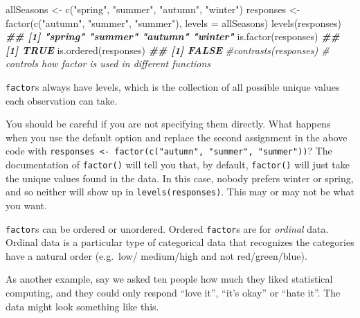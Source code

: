 \documentclass[
  12pt,
]{krantz}
\makeatletter
\newenvironment{Shaded}{\begin{snugshade}}{\end{snugshade}}
\newcommand{\AttributeTok}[1]{\textcolor[rgb]{0.61,0.61,0.61}{#1}}
\newcommand{\CommentTok}[1]{\textcolor[rgb]{0.37,0.37,0.37}{\textit{#1}}}
\newcommand{\DocumentationTok}[1]{\textcolor[rgb]{0.37,0.37,0.37}{\textbf{\textit{#1}}}}
\newcommand{\FunctionTok}[1]{\textcolor[rgb]{0,0,0}{#1}}
\newcommand{\NormalTok}[1]{#1}
\newcommand{\OtherTok}[1]{\textcolor[rgb]{0.37,0.37,0.37}{#1}}
\newcommand{\StringTok}[1]{\textcolor[rgb]{0.5,0.5,0.5}{#1}}
\newenvironment{kframe}{%
\medskip{}
\setlength{\fboxsep}{.8em}
 \def\at@end@of@kframe{}%
 \ifinner\ifhmode%
  \def\at@end@of@kframe{\end{minipage}}%
  \begin{minipage}{\columnwidth}%
 \fi\fi%
 \def\FrameCommand##1{\hskip\@totalleftmargin \hskip-\fboxsep
 \colorbox{shadecolor}{##1}\hskip-\fboxsep
     \hskip-\linewidth \hskip-\@totalleftmargin \hskip\columnwidth}%
 \MakeFramed {\advance\hsize-\width
   \@totalleftmargin\z@ \linewidth\hsize
   \@setminipage}}%
 {\par\unskip\endMakeFramed%
 \at@end@of@kframe}
\renewenvironment{Shaded}{\begin{kframe}}{\end{kframe}}
\makeatother
\begin{document}
\begin{Shaded}
\begin{Highlighting}[]
\NormalTok{allSeasons }\OtherTok{\textless{}{-}} \FunctionTok{c}\NormalTok{(}\StringTok{"spring"}\NormalTok{, }\StringTok{"summer"}\NormalTok{, }\StringTok{"autumn"}\NormalTok{, }\StringTok{"winter"}\NormalTok{)}
\NormalTok{responses }\OtherTok{\textless{}{-}} \FunctionTok{factor}\NormalTok{(}\FunctionTok{c}\NormalTok{(}\StringTok{"autumn"}\NormalTok{, }\StringTok{"summer"}\NormalTok{, }\StringTok{"summer"}\NormalTok{), }
                    \AttributeTok{levels =}\NormalTok{ allSeasons)}
\FunctionTok{levels}\NormalTok{(responses)}
\DocumentationTok{\#\# [1] "spring" "summer" "autumn" "winter"}
\FunctionTok{is.factor}\NormalTok{(responses)}
\DocumentationTok{\#\# [1] TRUE}
\FunctionTok{is.ordered}\NormalTok{(responses)}
\DocumentationTok{\#\# [1] FALSE}
\CommentTok{\#contrasts(responses) \# controls how factor is used in different  functions}
\end{Highlighting}
\end{Shaded}

\texttt{factor}s always have levels, which is the collection of all possible unique values each observation can take.

You should be careful if you are not specifying them directly. What happens when you use the default option and replace the second assignment in the above code with \texttt{responses\ \textless{}-\ factor(c("autumn",\ "summer",\ "summer"))}? The documentation of \texttt{factor()} will tell you that, by default, \texttt{factor()} will just take the unique values found in the data. In this case, nobody prefers winter or spring, and so neither will show up in \texttt{levels(responses)}. This may or may not be what you want.

\texttt{factor}s can be ordered or unordered. Ordered \texttt{factor}s are for \emph{ordinal} data. Ordinal data is a particular type of categorical data that recognizes the categories have a natural order (e.g.~low/ medium/high and not red/green/blue).

As another example, say we asked ten people how much they liked statistical computing, and they could only respond ``love it'', ``it's okay'' or ``hate it''. The data might look something like this.
\end{document}
